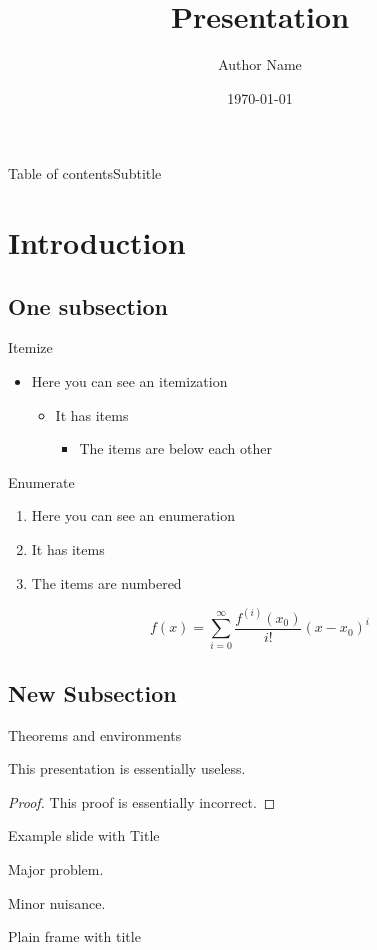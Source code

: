 \documentclass{beamer}
\author{Author Name}
\title{Presentation}
\date{\today}
\begin{document}
\frame{\maketitle}
\begin{frame}{Table of contents}{Subtitle}
	\tableofcontents
\end{frame}

\section{Introduction}
\subsection{One subsection}
\begin{frame}{Itemize}
\begin{itemize}
\item Here you can see an itemization
\begin{itemize}
\item It has items
\begin{itemize}
\item The items are below each other
\end{itemize}
\end{itemize}
\end{itemize}
\end{frame}

\begin{frame}{Enumerate}
\begin{enumerate}
\item Here you can see an enumeration
\item It has items
\item The items are numbered
\end{enumerate}
\[
	f(x)=\sum_{i=0}^\infty \frac{f^{(i)}(x_0)}{i!}(x-x_0)^i
\]
\end{frame}

\subsection{New Subsection}
\begin{frame}{Theorems and environments}
\begin{theorem}
This presentation is essentially useless.
\end{theorem}
\begin{proof}
This proof is essentially incorrect.
\end{proof}
\end{frame}

\begin{frame}{Example slide with Title}
\begin{example}
Major problem.
\end{example}
\begin{solution}
Minor nuisance.
\end{solution}
\end{frame}

\begin{frame}[plain]{Plain frame with title}
\lipsum[1]
\end{frame}
\end{document}
